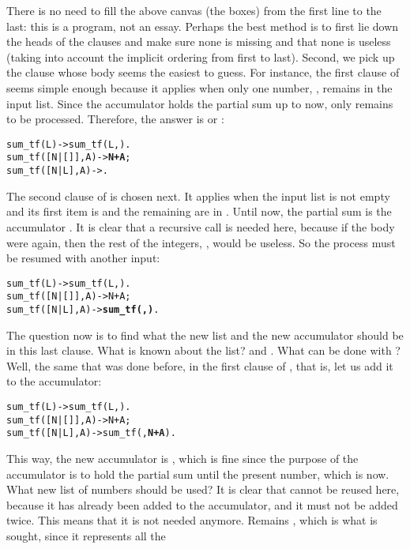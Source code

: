 There is no need to fill the above canvas (the boxes) from the first
line to the last: this is a program, not an essay. Perhaps the best
method is to first lie down the heads of the clauses and make sure
none is missing and that none is useless (taking into account the
implicit ordering from first to last). Second, we pick up the clause
whose body seems the easiest to guess. For instance, the first clause
of  seems simple enough because it applies when only
one number, , remains in the input list. Since the
accumulator  holds the partial sum up to now, only
 remains to be processed. Therefore, the answer is
 or :
\begin{alltt}
sum_tf(L)        -> sum_tf(L,).
sum_tf([N|[]],A) -> \textbf{N+A};
sum_tf([N| L],A) -> .
\end{alltt}
The second clause of  is chosen next. It applies
when the input list is not empty and its first item is  and
the remaining are in . Until now, the partial sum is the
accumulator . It is clear that a recursive call is needed
here, because if the body were  again, then the rest of
the integers, , would be useless. So the process must be
resumed with another input:
\begin{alltt}
sum_tf(L)        -> sum_tf(L,).
sum_tf([N|[]],A) -> N+A;
sum_tf([N |L],A) -> \textbf{sum_tf(}\textbf{,}\textbf{)}.
\end{alltt}
The question now is to find what the new list and the new accumulator
should be in this last clause. What is known about the list?
 and . What can be done with ? Well,
the same that was done before, in the first clause of
, that is, let us add it to the accumulator:
\begin{alltt}
sum_tf(L)        -> sum_tf(L,).
sum_tf([N|[]],A) -> N+A;
sum_tf([N| L],A) -> sum_tf(,\textbf{N+A}).
\end{alltt}
This way, the new accumulator is , which is fine since the
purpose of the accumulator is to hold the partial sum until the
present number, which is  now. What new list of numbers
should be used? It is clear that  cannot be reused here,
because it has already been added to the accumulator, and it must not
be added twice. This means that it is not needed anymore. Remains
, which is what is sought, since it represents all the
